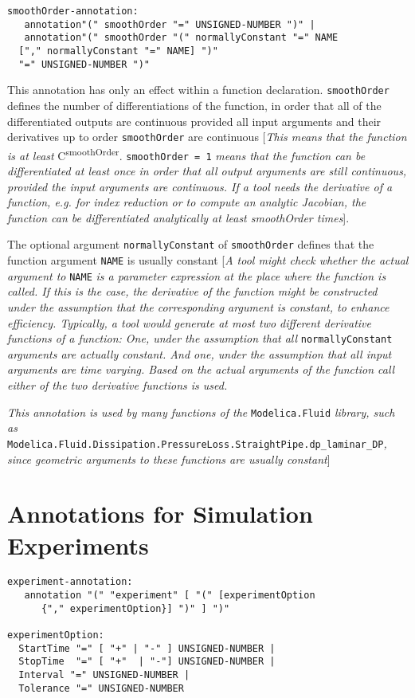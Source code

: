 \begin{lstlisting}[language=grammar]
smoothOrder-annotation:
   annotation"(" smoothOrder "=" UNSIGNED-NUMBER ")" |
   annotation"(" smoothOrder "(" normallyConstant "=" NAME
  ["," normallyConstant "=" NAME] ")"
  "=" UNSIGNED-NUMBER ")"
\end{lstlisting}
This annotation has only an effect within a function declaration.
\lstinline!smoothOrder! defines the number of differentiations of the function, in
order that all of the differentiated outputs are continuous provided all
input arguments and their derivatives up to order \lstinline!smoothOrder! are
continuous {[}\emph{This means that the function is at least}
C\textsuperscript{smoothOrder}. \lstinline!smoothOrder = 1! \emph{means that the
function can be differentiated at least once in order that all output
arguments are still continuous, provided the input arguments are
continuous. If a tool needs the derivative of a function, e.g. for index
reduction or to compute an analytic Jacobian, the function can be
differentiated analytically at least smoothOrder times}{]}.

The optional argument \lstinline!normallyConstant! of \lstinline!smoothOrder! defines that the
function argument \lstinline!NAME! is usually constant {[}\emph{A tool might check
whether the actual argument to} \lstinline!NAME! \emph{is a parameter expression at the
place where the function is called. If this is the case, the derivative
of the function might be constructed under the assumption that the
corresponding argument is constant, to enhance efficiency. Typically, a
tool would generate at most two different derivative functions of a
function: One, under the assumption that all} \lstinline!normallyConstant! \emph{arguments
are actually constant. And one, under the assumption that all input
arguments are time varying. Based on the actual arguments of the
function call either of the two derivative functions is used.}

\emph{This annotation is used by many functions of the} \lstinline!Modelica.Fluid!
\emph{library, such as}\\
\lstinline!Modelica.Fluid.Dissipation.PressureLoss.StraightPipe.dp_laminar_DP!\emph{,
since geometric arguments to these functions are usually constant}{]}

\section{Annotations for Simulation Experiments}
\begin{lstlisting}[language=grammar]
experiment-annotation:
   annotation "(" "experiment" [ "(" [experimentOption
      {"," experimentOption}] ")" ] ")"

experimentOption:
  StartTime "=" [ "+" | "-" ] UNSIGNED-NUMBER |
  StopTime  "=" [ "+"  | "-"] UNSIGNED-NUMBER |
  Interval "=" UNSIGNED-NUMBER |
  Tolerance "=" UNSIGNED-NUMBER
\end{lstlisting}

